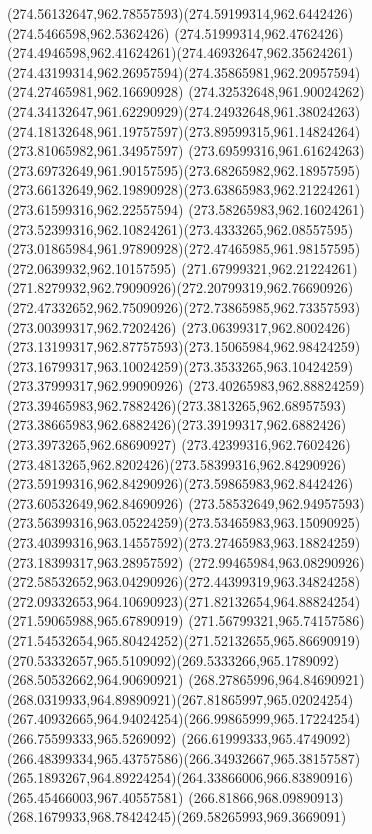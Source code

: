 {    \curveto(274.56132647,962.78557593)(274.59199314,962.6442426)(274.5466598,962.5362426)
    \curveto(274.51999314,962.4762426)(274.4946598,962.41624261)(274.46932647,962.35624261)
    \curveto(274.43199314,962.26957594)(274.35865981,962.20957594)(274.27465981,962.16690928)
    \curveto(274.32532648,961.90024262)(274.34132647,961.62290929)(274.24932648,961.38024263)
    \curveto(274.18132648,961.19757597)(273.89599315,961.14824264)(273.81065982,961.34957597)
    \curveto(273.69599316,961.61624263)(273.69732649,961.90157595)(273.68265982,962.18957595)
    \curveto(273.66132649,962.19890928)(273.63865983,962.21224261)(273.61599316,962.22557594)
    \curveto(273.58265983,962.16024261)(273.52399316,962.10824261)(273.4333265,962.08557595)
    \curveto(273.01865984,961.97890928)(272.47465985,961.98157595)(272.0639932,962.10157595)
    \curveto(271.67999321,962.21224261)(271.8279932,962.79090926)(272.20799319,962.76690926)
    \curveto(272.47332652,962.75090926)(272.73865985,962.73357593)(273.00399317,962.7202426)
    \curveto(273.06399317,962.8002426)(273.13199317,962.87757593)(273.15065984,962.98424259)
    \curveto(273.16799317,963.10024259)(273.3533265,963.10424259)(273.37999317,962.99090926)
    \curveto(273.40265983,962.88824259)(273.39465983,962.7882426)(273.3813265,962.68957593)
    \curveto(273.38665983,962.6882426)(273.39199317,962.6882426)(273.3973265,962.68690927)
    \curveto(273.42399316,962.7602426)(273.4813265,962.8202426)(273.58399316,962.84290926)
    \curveto(273.59199316,962.84290926)(273.59865983,962.8442426)(273.60532649,962.84690926)
    \curveto(273.58532649,962.94957593)(273.56399316,963.05224259)(273.53465983,963.15090925)
    \curveto(273.40399316,963.14557592)(273.27465983,963.18824259)(273.18399317,963.28957592)
    \curveto(272.99465984,963.08290926)(272.58532652,963.04290926)(272.44399319,963.34824258)
    \curveto(272.09332653,964.10690923)(271.82132654,964.88824254)(271.59065988,965.67890919)
    \curveto(271.56799321,965.74157586)(271.54532654,965.80424252)(271.52132655,965.86690919)
    \curveto(270.53332657,965.5109092)(269.5333266,965.1789092)(268.50532662,964.90690921)
    \curveto(268.27865996,964.84690921)(268.0319933,964.89890921)(267.81865997,965.02024254)
    \curveto(267.40932665,964.94024254)(266.99865999,965.17224254)(266.75599333,965.5269092)
    \curveto(266.61999333,965.4749092)(266.48399334,965.43757586)(266.34932667,965.38157587)
    \curveto(265.1893267,964.89224254)(264.33866006,966.83890916)(265.45466003,967.40557581)
    \curveto(266.81866,968.09890913)(268.1679933,968.78424245)(269.58265993,969.3669091)
}
